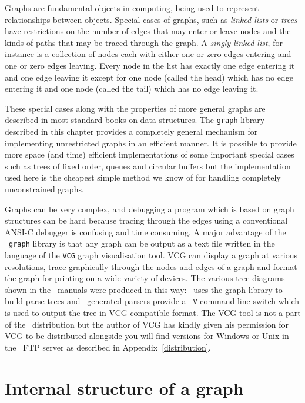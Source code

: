 Graphs are fundamental objects in computing, being used to represent
relationships between objects. Special cases of graphs, such as {\em
linked lists} or {\em trees} have restrictions on the number of edges that
may enter or leave nodes and the kinds of paths that may be traced
through the graph. A {\em singly linked list}, for instance is a
collection of nodes each with either one or zero edges entering and
one or zero edges leaving. Every node in the list has exactly one edge entering it
and one edge leaving it except for  one node (called the head) which has
no edge entering it and one node (called the tail) which has no edge
leaving it.

These special cases along with the properties of more general graphs are
described in most standard books on data structures. The {\tt graph}
library described in this chapter provides a completely general
mechanism for implementing unrestricted graphs in an efficient manner.
It is possible to provide more space (and time) efficient
implementations of some important special cases such as  trees of fixed
order, queues and circular buffers but the implementation used here is
the cheapest simple method we know of for handling completely unconstrained
graphs.

Graphs can be very complex, and debugging a program which is based on graph
structures can be hard because tracing through the edges using a
conventional ANSI-C debugger is confusing and time consuming. A major
advantage of the \rdp\ {\tt graph} library is that any graph can be
output as a text file written in the language of the {\tt VCG} graph
visualisation tool. VCG can display a graph at various resolutions, trace
graphically through the nodes and edges of a graph and format the graph
for printing on a wide variety of devices. The various tree diagrams
shown in the \rdp\ manuals were produced in this way: \rdp\ uses the
graph library to build parse trees and \rdp\ generated parsers provide a
{\tt -V} command line switch which is used to output the tree in VCG
compatible format. The VCG tool is not a part of the \rdp\ distribution
but the author of VCG has kindly given his permission for VCG to be
distributed alongside \rdp\dash you will find versions for Windows or
Unix in the \rdp\ FTP server as described in
Appendix~\ref{distribution}.

\section{Internal structure of a graph}

